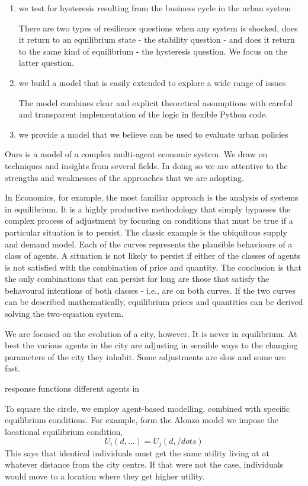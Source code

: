 \begin{enumerate}
    \item we test for hysteresis resulting from the business cycle   in the urban system 

There are two types of resilience questions when any system is shocked, does it return to an equilibrium state - the stability question - and does it return to the same kind of equilibrium - the hysteresis question. We focus on the latter question.  


    \item we build a model that is easily extended to explore a wide range of issues

The model combines clear and explicit theoretical assumptions with careful and transparent implementation of the logic in flexible Python code.

    \item we provide a model that we believe can be used  to evaluate urban policies
\end{enumerate}


Ours is a  model of a complex multi-agent economic system. We draw on techniques and insights from several fields. In doing so we are attentive to the strengths and weaknesses of  the  approaches that we are adopting. 

In Economics, for example, the most familiar approach is the  analysis of systems in equilibrium. It is a highly productive methodology that simply bypasses the complex process of adjustment by focusing on conditions that must be true if a particular situation is to persist. The classic example is the ubiquitous supply and demand model. Each of the curves represents the plausible behaviours of a class of agents. A  situation is not likely to persist if either of the classes of agents is not satisfied with the combination of price and quantity. The conclusion   is that the only combinations that can persist for long are  those that satisfy the behavoural intentions of both classes - i.e., are on both curves. If the two curves can be described mathematically, equilibrium prices and quantities  can be derived solving the two-equation system.

We are focused on the evolution of a city, however. It is never in equilibrium. At best the various agents in the city are adjusting in sensible ways to the changing parameters of the city they inhabit. Some adjustments are slow and some are fast. 

response functions
different agents in 

To square the circle, we employ  agent-based modelling, combined with specific equilibrium conditions. For example, form the Alonzo model we impose the locational equilibrium condition,
\[U_i(d,\dots)=U_j(d, /dots)\]
This says that identical individuals must get the same utility living at at whatever distance from the city centre. If that were not the case, individuals would move to a location where they get higher utility.

